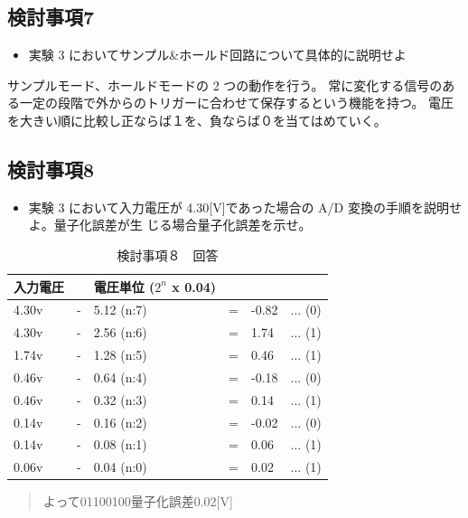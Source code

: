 \documentclass[10pt]{article}
\begin{document}
\subsection{検討事項7}

\begin{itemize}
    \item 実験 3 においてサンプル&ホールド回路について具体的に説明せよ 
\end{itemize}
    サンプルモード、ホールドモードの 2 つの動作を行う。             常に変化する信号のある一定の段階で外からのトリガーに合わせて保存するという機能を持つ。
    電圧を大きい順に比較し正ならば１を、負ならば０を当てはめていく。 

 \subsection{検討事項8}
 \begin{itemize}
     \item 実験 3 において入力電圧が 4.30[V]であった場合の A/D 変換の手順を説明せよ。量子化誤差が生 じる場合量子化誤差を示せ。 
 \end{itemize}
 \begingroup
\setlength{\tabcolsep}{5pt} %
\renewcommand{\arraystretch}{1.5} %
\begin{table}[H]
    \centering
    \caption{検討事項８　回答}
	\begin{tabular}{|llllll|}
	    \hline
	    入力電圧 &  & 電圧単位 ($2^n$ x 0.04) &  & & \\[0.5ex]
		\hline\hline
		4.30v　& - & 5.12 (n:7) & = & -0.82 & ... (0)	 \\ \hline
		4.30v　& - & 2.56 (n:6) & = & 1.74 & ... (1)	 \\ \hline
		1.74v　& - & 1.28 (n:5) & = & 0.46 & ... (1)	 \\ \hline
		0.46v　& - & 0.64 (n:4) & = & -0.18 & ... (0)	 \\ \hline
		0.46v　& - & 0.32 (n:3) & = & 0.14 & ... (1)	 \\ \hline
		0.14v　& - & 0.16 (n:2) & = & -0.02 & ... (0)	 \\ \hline
		0.14v　& - & 0.08 (n:1) & = & 0.06 & ... (1)	 \\ \hline
		0.06v　& - & 0.04 (n:0) & = & 0.02 & ... (1)	 \\ \hline
		
	\end{tabular}
\end{table} 
\endgroup

\begin{quote}
    \centering
    よって01100100量子化誤差0.02[V]
\end{quote}
\end{document}
